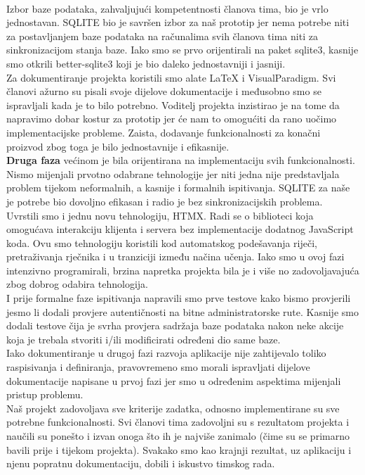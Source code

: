 		\newline
		\\
		Izbor baze podataka, zahvaljujući kompetentnosti članova tima, bio je vrlo jednostavan. SQLITE bio je savršen izbor za naš prototip jer nema potrebe niti za postavljanjem baze podataka na računalima svih članova tima niti za sinkronizacijom stanja baze. Iako smo se prvo orijentirali na paket sqlite3, kasnije smo otkrili better-sqlite3 koji je bio daleko jednostavniji i jasniji.
		\newline
		\\
		 Za dokumentiranje projekta koristili smo alate LaTeX i VisualParadigm. Svi članovi ažurno su pisali svoje dijelove dokumentacije i međusobno smo se ispravljali kada je to bilo potrebno. Voditelj projekta inzistirao je na tome da napravimo dobar kostur za prototip jer će nam to omogućiti da rano uočimo implementacijske probleme. Zaista, dodavanje funkcionalnosti za konačni proizvod zbog toga je bilo jednostavnije i efikasnije.
		 \newline
		\\
		\textbf{Druga faza} većinom je bila orijentirana na implementaciju svih funkcionalnosti. Nismo mijenjali prvotno odabrane tehnologije jer niti jedna nije predstavljala problem tijekom neformalnih, a kasnije i formalnih ispitivanja. SQLITE za naše je potrebe bio dovoljno efikasan i radio je bez sinkronizacijskih problema. 
		\newline
		\\
		Uvrstili smo i jednu novu tehnologiju, HTMX. Radi se o biblioteci koja omogućava interakciju klijenta i servera bez implementacije dodatnog JavaScript koda. Ovu smo tehnologiju koristili kod automatskog podešavanja riječi, pretraživanja rječnika i u tranziciji između načina učenja. Iako smo u ovoj fazi intenzivno programirali, brzina napretka projekta bila je i više no zadovoljavajuća zbog dobrog odabira tehnologija.
		\newline
		\\
		I prije formalne faze ispitivanja napravili smo prve testove kako bismo provjerili jesmo li dodali provjere autentičnosti na bitne administratorske rute. Kasnije smo dodali testove čija je svrha provjera sadržaja baze podataka nakon neke akcije koja je trebala stvoriti i/ili modificirati određeni dio same baze. 
		\newline
		\\
		Iako dokumentiranje u drugoj fazi razvoja aplikacije nije zahtijevalo toliko raspisivanja i definiranja, pravovremeno smo morali ispravljati dijelove dokumentacije napisane u prvoj fazi jer smo u određenim aspektima mijenjali pristup problemu.
		\newline
		\\
	   \indent 
	   Naš projekt zadovoljava sve kriterije zadatka, odnosno implementirane su sve potrebne funkcionalnosti. Svi članovi tima zadovoljni su s rezultatom projekta i naučili su ponešto i izvan onoga što ih je najviše zanimalo (čime su se primarno bavili prije i tijekom projekta). Svakako smo kao krajnji rezultat, uz aplikaciju i njenu popratnu dokumentaciju, dobili i iskustvo timskog rada.
		 \eject 